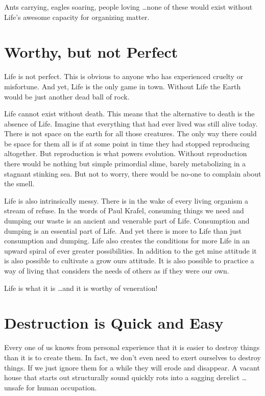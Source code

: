 \documentclass[ebook,11pt,openany,twoside]{memoir}
\newcommand{\imagefacingchapter}[1]{
  \cleartoverso
  \clearpage \null
  \thispagestyle{cleared}
  \AddToShipoutPictureBG*{%
    \AtStockLowerLeft{%
      \texttt{[image: \#1]}
    }
  }
  \clearpage
}
\begin{document}
Ants carrying, eagles soaring, people loving \ldots none of these would exist
without Life's awesome capacity for organizing matter.

\imagefacingchapter{images/WhatIsWorthy-cropped}
\chapter{Worthy, but not Perfect}

Life is not perfect. This is obvious to anyone who has experienced cruelty or
misfortune. And yet, Life is the only game in town. Without Life the Earth
would be just another dead ball of rock.

Life cannot exist without death. This means that the alternative to death is
the absence of Life. Imagine that everything that had ever lived was still
alive today. There is not space on the earth for all those creatures. The only
way there could be space for them all is if at some point in time they had
stopped reproducing altogether. But reproduction is what powers evolution.
Without reproduction there would be nothing but simple primordial slime, barely
metabolizing in a stagnant stinking sea. But not to worry, there would be
no-one to complain about the smell.

Life is also intrinsically messy. There is in the wake of every living organism
a stream of refuse. In the words of Paul Krafel, consuming things we need and
dumping our waste is an ancient and venerable part of Life. Consumption and
dumping is an essential part of Life. And yet there is more to Life than just
consumption and dumping. Life also creates the conditions for more Life in an
upward spiral of ever greater possibilities. In addition to the get mine
attitude it is also possible to cultivate a grow ours attitude. It is also
possible to practice a way of living that considers the needs of others as if
they were our own.

Life is what it is \ldots and it is worthy of veneration!

\imagefacingchapter{images/CollapsingHouse}
\chapter{Destruction is Quick and Easy}

Every one of us knows from personal experience that it is easier to destroy
things than it is to create them. In fact, we don't even need to exert
ourselves to destroy things. If we just ignore them for a while they will erode
and disappear. A vacant house that starts out structurally sound quickly rots
into a sagging derelict \ldots unsafe for human occupation.
\end{document}
